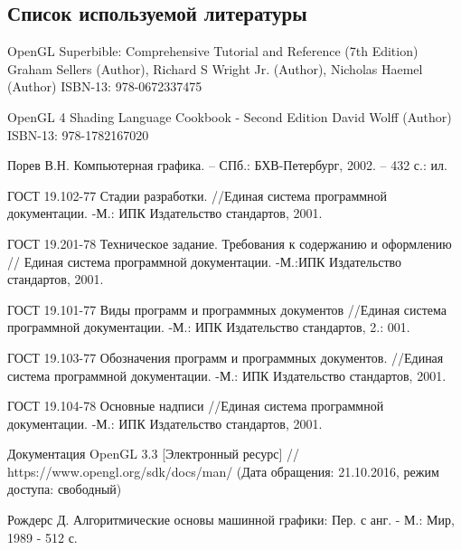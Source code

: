 \subsection{ Список используемой литературы}
\begin{my_enumerate}
\item
OpenGL Superbible: Comprehensive Tutorial and Reference (7th Edition)
Graham Sellers (Author), Richard S Wright Jr. (Author), Nicholas Haemel (Author)
ISBN-13: 978-0672337475

\item
OpenGL 4 Shading Language Cookbook - Second Edition
David Wolff (Author)
ISBN-13: 978-1782167020

\item
Порев В.Н. Компьютерная графика. – СПб.: БХВ-Петербург, 2002. – 432 с.: ил.

\item
ГОСТ 19.102-77 Стадии разработки. //Единая система программной документации. -М.: ИПК Издательство стандартов, 2001.

\item
ГОСТ 19.201-78 Техническое задание. Требования к содержанию и оформлению // Единая система программной документации. -М.:ИПК Издательство стандартов, 2001.

\item
ГОСТ 19.101-77 Виды программ и программных документов
//Единая система программной документации. -М.: ИПК Издательство стандартов, 2.: 001.

\item
ГОСТ 19.103-77 Обозначения программ и программных документов. //Единая система программной документации. -М.: ИПК Издательство стандартов, 2001.

\item
 ГОСТ 19.104-78 Основные надписи //Единая система программной документации. -М.: ИПК Издательство стандартов, 2001.

\item
Документация OpenGL 3.3 [Электронный ресурс] // https://www.opengl.org/sdk/docs/man/ (Дата обращения: 21.10.2016, режим доступа: свободный)

\item
Рождерс Д. Алгоритмические основы машинной графики: Пер. с анг. - М.: Мир, 1989 - 512 с.

\end{my_enumerate}

